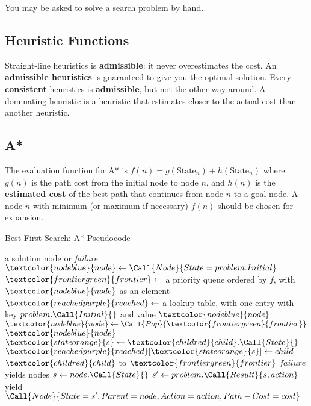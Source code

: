 \documentclass[exam={Midterm},color=true]{cs581exam}
\renewcommand{\emph}[1]{\textbf{#1}}
\begin{document}
You may be asked to solve a search problem by hand.
\subsection{Heuristic Functions}\label{subsec:3.6}
Straight-line heuristics is \emph{admissible}: it never overestimates the cost.
An \emph{admissible heuristics} is guaranteed to give you the optimal solution.
Every \emph{consistent} heuristics is \emph{admissible}, but not the other way around.
A dominating heuristic is a heuristic that estimates closer to the actual cost than another heuristic.

\subsection{A*}\label{subsec:a*}
The evaluation function for A* is $f(n) = g(\mbox{State}_{n}) + h(\mbox{State}_{n})$ where $g(n)$ is the path cost from the initial node to node $n$,
and $h(n)$ is the \emph{estimated cost} of the best path that continues from node $n$ to a goal node.
A node $n$ with minimum (or maximum if necessary) $f(n)$ should be chosen for expansion.
\begin{algorithm}[H]
	\caption{Best-First Search: A* Pseudocode}\label{alg:a*}
	\begin{algorithmic}[1]
		 \Returns a solution node or \textit{failure}
			\State $\textcolor{nodeblue}{node}\gets\Call{Node}{State=problem.Initial}$
			\State $\textcolor{frontiergreen}{frontier}\gets$ a priority queue ordered by $f$, with $\textcolor{nodeblue}{node}$ as an element
			\State $\textcolor{reachedpurple}{reached}\gets$ a lookup table, with one entry with key $problem.\Call{Initial}{}$ and value $\textcolor{nodeblue}{node}$
				\State $\textcolor{nodeblue}{node}\gets\Call{Pop}{\textcolor{frontiergreen}{frontier}}$
					\Return $\textcolor{nodeblue}{node}$
				\EndIf
					\State $\textcolor{stateorange}{s}\gets \textcolor{childred}{child}.\Call{State}{}$
						\State $\textcolor{reachedpurple}{reached}[\textcolor{stateorange}{s}]\gets child$
						\State $\textcolor{childred}{child}$ to $\textcolor{frontiergreen}{frontier}$
					\EndIf
				\EndFor
			\EndWhile
			\State \Return $failure$
		\EndFunction
		 yields nodes
			\State $s\gets node.\Call{State}{}$
				\State $s'\gets problem.\Call{Result}{s, action}$
				\State {}
				\State yield $\Call{Node}{State=s', Parent=node, Action=action, Path-Cost=cost}$
			\EndFor
		\EndFunction
	\end{algorithmic}
\end{algorithm}
\end{document}

